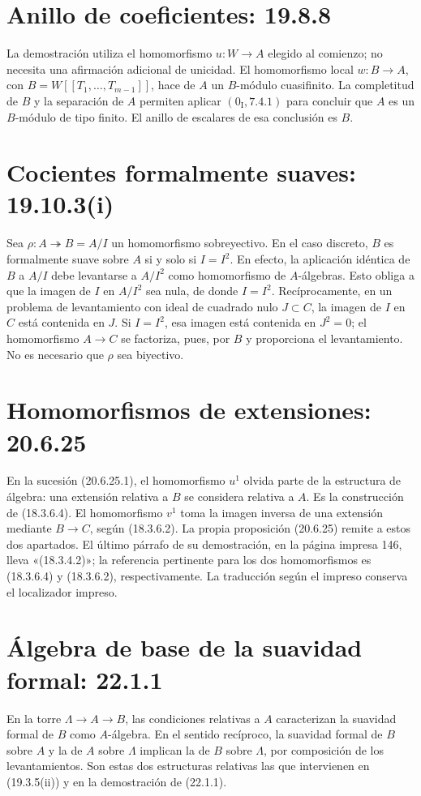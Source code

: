 \documentclass[11pt,a4paper]{article}
\begin{document}
\section*{Anillo de coeficientes: 19.8.8}
La demostración utiliza el homomorfismo $u:W\to A$ elegido al comienzo;
no necesita una afirmación adicional de unicidad.
El homomorfismo local $w:B\to A$, con
$B=W[[T_1,\ldots,T_{m-1}]]$, hace de $A$ un $B$-módulo cuasifinito.
La completitud de $B$ y la separación de $A$ permiten aplicar
$(0_{\mathrm I},7.4.1)$ para concluir que $A$ es un $B$-módulo de tipo
finito. El anillo de escalares de esa conclusión es $B$.

\section*{Cocientes formalmente suaves: 19.10.3(i)}
Sea $\rho:A\twoheadrightarrow B=A/I$ un homomorfismo sobreyectivo.
En el caso discreto, $B$ es formalmente suave sobre $A$ si y solo si $I=I^2$.
En efecto, la aplicación idéntica de $B$ a $A/I$ debe levantarse a
$A/I^2$ como homomorfismo de $A$-álgebras. Esto obliga a que la imagen de
$I$ en $A/I^2$ sea nula, de donde $I=I^2$.
Recíprocamente, en un problema de levantamiento con ideal de cuadrado nulo
$J\subset C$, la imagen de $I$ en $C$ está contenida en $J$.
Si $I=I^2$, esa imagen está contenida en $J^2=0$; el homomorfismo
$A\to C$ se factoriza, pues, por $B$ y proporciona el levantamiento.
No es necesario que $\rho$ sea biyectivo.

\section*{Homomorfismos de extensiones: 20.6.25}
En la sucesión (20.6.25.1), el homomorfismo $u^1$ olvida parte de la
estructura de álgebra: una extensión relativa a $B$ se considera relativa
a $A$. Es la construcción de (18.3.6.4). El homomorfismo $v^1$ toma la
imagen inversa de una extensión mediante $B\to C$, según (18.3.6.2).
La propia proposición (20.6.25) remite a estos dos apartados.
El último párrafo de su demostración, en la página impresa 146, lleva
«(18.3.4.2)»; la referencia pertinente para los dos homomorfismos es
(18.3.6.4) y (18.3.6.2), respectivamente. La traducción según el impreso
conserva el localizador impreso.

\section*{Álgebra de base de la suavidad formal: 22.1.1}
En la torre $\Lambda\to A\to B$, las condiciones relativas a $A$
caracterizan la suavidad formal de $B$ como $A$-álgebra.
En el sentido recíproco, la suavidad formal de $B$ sobre $A$ y la de $A$
sobre $\Lambda$ implican la de $B$ sobre $\Lambda$, por composición
de los levantamientos. Son estas dos estructuras relativas las que
intervienen en (19.3.5(ii)) y en la demostración de (22.1.1).
\end{document}
